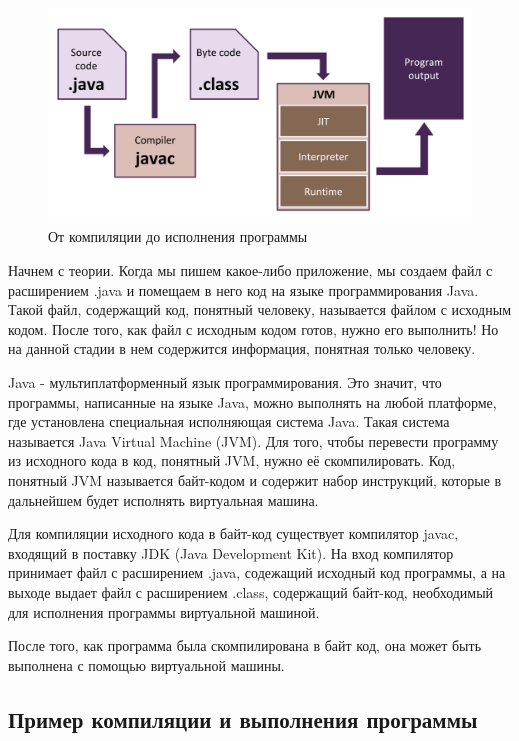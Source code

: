 \documentclass[]{scrartcl}
\begin{document}
\begin{figure}[h]
	\includegraphics[width=\linewidth]{from-source-to-program.png}
	\caption{От компиляции до исполнения программы}
\end{figure}


Начнем с теории. Когда мы пишем какое-либо приложение, мы создаем файл с расширением .java и помещаем в него код на языке программирования Java. Такой файл, содержащий код, понятный человеку, называется файлом с исходным кодом. После того, как файл с исходным кодом готов, нужно его выполнить! Но на данной стадии в нем содержится информация, понятная только человеку. 

Java - мультиплатформенный язык программирования. Это значит, что программы, написанные на языке Java, можно выполнять на любой платформе, где установлена специальная исполняющая система Java. Такая система называется Java Virtual Machine (JVM). Для того, чтобы перевести программу из исходного кода в код, понятный JVM, нужно её скомпилировать. Код, понятный JVM называется байт-кодом и содержит набор инструкций, которые в дальнейшем будет исполнять виртуальная машина.

Для компиляции исходного кода в байт-код существует компилятор javac, входящий в поставку JDK (Java Development Kit). На вход компилятор принимает файл с расширением .java, содежащий исходный код программы, а на выходе выдает файл с расширением .class, содержащий байт-код, необходимый для исполнения программы виртуальной машиной.

После того, как программа была скомпилирована в байт код, она может быть выполнена с помощью виртуальной машины.

\subsection{Пример компиляции и выполнения программы}
\end{document}
